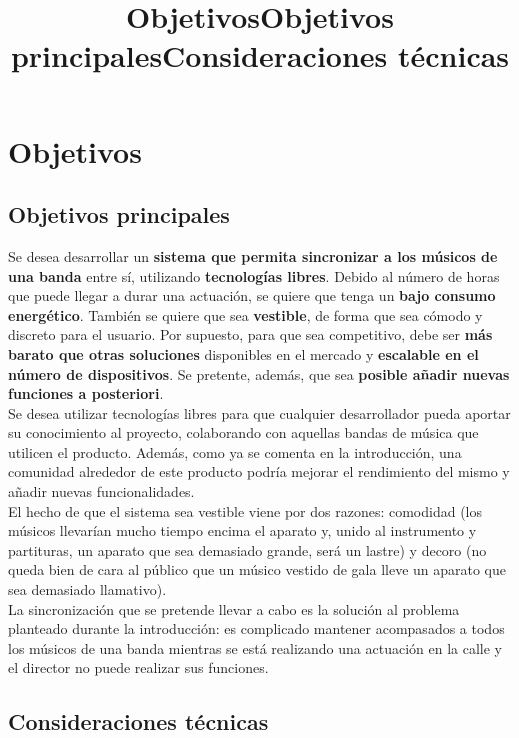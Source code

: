 \chapter{Objetivos}
\title{Objetivos}

\title{Objetivos principales}
\section{
Objetivos principales
}
Se desea desarrollar un \textbf{sistema que permita sincronizar a los músicos de una banda} entre sí,
utilizando \textbf{tecnologías libres}. Debido al número de horas que puede llegar a durar una
actuación, se quiere que tenga un \textbf{bajo consumo energético}. También se quiere que sea
\textbf{vestible}, de forma que sea cómodo y discreto para el usuario. Por supuesto, para que
sea competitivo, debe ser \textbf{más barato que otras soluciones} disponibles en el mercado y
\textbf{escalable en el número de dispositivos}. Se pretente, además, que sea \textbf{posible añadir nuevas
funciones a posteriori}.\\

Se desea utilizar tecnologías libres para que cualquier desarrollador pueda aportar su conocimiento al proyecto, colaborando
con aquellas bandas de música que utilicen el producto. Además, como ya se comenta en la introducción,
una comunidad alrededor de este producto podría mejorar el rendimiento del mismo y añadir nuevas funcionalidades.\\

El hecho de que el sistema sea vestible viene por dos razones: comodidad (los músicos llevarían mucho tiempo encima el aparato y,
unido al instrumento y partituras, un aparato que sea demasiado grande, será un lastre) y decoro (no queda bien de cara al público que
un músico vestido de gala lleve un aparato que sea demasiado llamativo).\\

La sincronización que se pretende llevar a cabo es la solución al problema planteado durante la introducción: es complicado
mantener acompasados a todos los músicos de una banda mientras se está realizando una actuación en la calle y el director no puede
realizar sus funciones.\\


\title{Consideraciones técnicas}
\section{Consideraciones técnicas}

